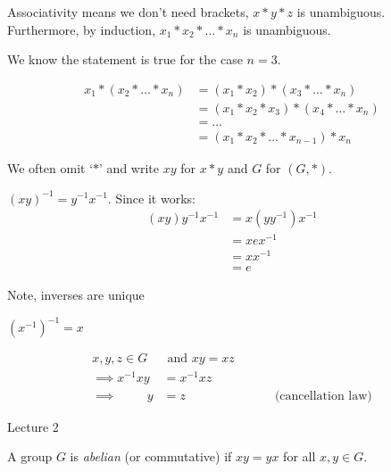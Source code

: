 \begin{remark}[i]
Associativity means we don't need brackets, \(x * y * z\) is unambiguous.
Furthermore, by induction, \(x_1 * x_2 * \ldots * x_n\) is unambiguous.

We know the statement is true for the case \(n = 3\).

\begin{align*}
    x_1 * (x_2 * \ldots * x_n) &= (x_1 * x_2) * (x_3 * \ldots * x_n) \\
    &= (x_1 * x_2 * x_3) * (x_4 * \ldots * x_n) \\
    &= \ldots \\
    &= (x_1 * x_2 * \ldots * x_{n-1}) * x_n
\end{align*}
\end{remark}

\begin{remark}[ii]
We often omit `\(*\)' and write \(x y\) for \(x * y\) and \(G\) for \((G, *)\).
\end{remark}

\begin{remark}[iii]
\((xy)^{-1} = y^{-1} x^{-1}\). Since it works:
\begin{align*}
    (xy)y^{-1}x^{-1} &= x(y y^{-1})x^{-1} \\
    &= x e x^{-1} \\
    &= x x^{-1} \\
    &= e
\end{align*}
\end{remark}

Note, inverses are unique

\begin{remark}[iv]
\((x^{-1})^{-1} = x\)
\end{remark}

\begin{remark}[v]
\begin{align*}
    x, y, z \in G &\text{ and } xy = xz \\
    \implies x^{-1} x y &= x^{-1} x z \\
    \implies \hspace{1cm} y &= z \hspace{3cm} \text{(cancellation law)}
\end{align*}
\end{remark}

Lecture 2

\begin{definition}
A group \(G\) is \emph{abelian} (or commutative) if \(xy = yx\) for all \(x, y \in G\).
\end{definition}

